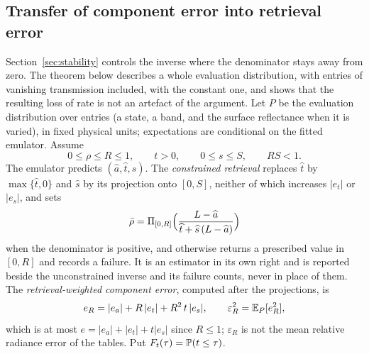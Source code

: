 \subsection{Transfer of component error into retrieval error}\label{sec:transfer}

Section~\ref{sec:stability} controls the inverse where the denominator stays away from zero. The theorem below
describes a whole evaluation distribution, with entries of vanishing transmission included, with the constant one,
and shows that the resulting loss of rate is not an artefact of the argument. Let $P$ be the evaluation distribution
over entries (a state, a band, and the surface reflectance when it is varied), in fixed physical units; expectations
are conditional on the fitted emulator. Assume
\begin{equation}\label{eq:transfer-hyp}
0\le\rho\le R\le1,\qquad t>0,\qquad 0\le s\le S,\qquad RS<1 .
\end{equation}
The emulator predicts $(\widehat a,\widehat t,\widehat s)$. The \emph{constrained retrieval} replaces $\widehat t$ by
$\max\{\widehat t,0\}$ and $\widehat s$ by its projection onto $[0,S]$, neither of which increases $|e_t|$ or
$|e_s|$, and sets
\begin{equation}\label{eq:rhobar}
\bar\rho=\Pi_{[0,R]}\Bigl(\frac{L-\widehat a}{\widehat t+\widehat s\,(L-\widehat a)}\Bigr)
\end{equation}
when the denominator is positive, and otherwise returns a prescribed value in $[0,R]$ and records a failure. It is
an estimator in its own right and is reported beside the unconstrained inverse and its failure counts, never in
place of them. The \emph{retrieval-weighted component error}, computed after the projections, is
\begin{equation}\label{eq:eR}
e_R=|e_a|+R\,|e_t|+R^2\,t\,|e_s|,\qquad \varepsilon_R^2=\mathbb{E}_P[e_R^2],
\end{equation}
which is at most $e=|e_a|+|e_t|+t|e_s|$ since $R\le1$; $\varepsilon_R$ is not the mean relative radiance error of
the tables. Put $F_t(\tau)=\mathbb{P}(t\le\tau)$.


